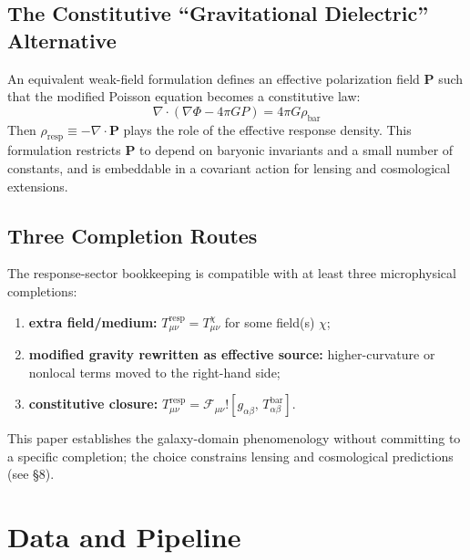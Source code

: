 \documentclass[11pt]{article}
\begin{document}
\subsection{The Constitutive ``Gravitational Dielectric'' Alternative}\label{the-constitutive-gravitational-dielectric-alternative}

An equivalent weak-field formulation defines an effective polarization field \(\mathbf{P}\) such that the modified Poisson equation becomes a constitutive law:
\begin{equation}
\nabla \cdot (\nabla\Phi - 4\pi G P) = 4\pi G\rho_{\text{bar}}
\label{eq:poisson-constitutive}
\end{equation}
Then
\(\rho_{\text{resp}} \equiv - \nabla \cdot \mathbf{P}\) plays the role of the effective response density. This formulation restricts \textbf{P} to depend on baryonic invariants and a small number of constants, and is embeddable in a covariant action for lensing and cosmological extensions.

\subsection{Three Completion Routes}\label{three-completion-routes}

The response-sector bookkeeping is compatible with at least three microphysical completions:

\begin{enumerate}
\def\labelenumi{(\roman{enumi})}
\item
  \textbf{extra field/medium:} \(T_{\mu\nu}^{\text{resp}} = T_{\mu\nu}^{\chi}\) for some field(s) \(\chi\);
\item
  \textbf{modified gravity rewritten as effective source:} higher-curvature or nonlocal terms moved to the right-hand side;
\item
  \textbf{constitutive closure:} \(T_{\mu\nu}^{\text{resp}} = \mathcal{F}_{\mu\nu}\text{!}\left\lbrack g_{\alpha\beta},\, T_{\alpha\beta}^{\text{bar}} \right\rbrack\).
\end{enumerate}

This paper establishes the galaxy-domain phenomenology without committing to a specific completion; the choice constrains lensing and cosmological predictions (see §8).


\section{Data and Pipeline}\label{data-and-pipeline}
\end{document}
